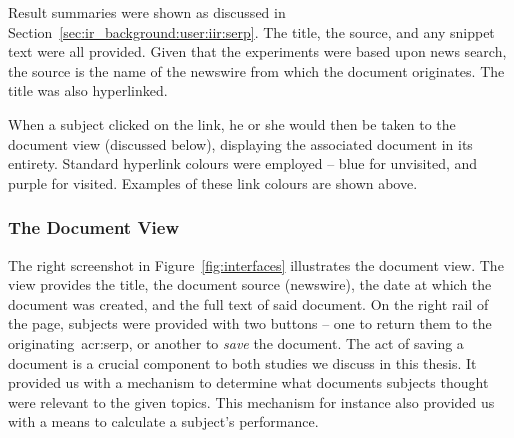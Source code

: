 \begin{figure}[h]
    \centering
    \vspace{4mm}
    \label{fig:serp_buttons}
    \vspace{-5mm}
\end{figure}

Result summaries were shown as discussed in Section~\ref{sec:ir_background:user:iir:serp}. The title, the source, and any snippet text were all provided. Given that the experiments were based upon news search, the source is the name of the newswire from which the document originates. The title was also hyperlinked.

\begin{figure}[h]
    \centering
    \vspace{0mm}
    \label{fig:serp_links}
    \vspace{-13mm}
\end{figure}

When a subject clicked on the link, he or she would then be taken to the document view (discussed below), displaying the associated document in its entirety. Standard hyperlink colours were employed -- blue for unvisited, and purple for visited. Examples of these link colours are shown above.

\subsubsection{The Document View}\label{sec:methodology:user:interface:document}
The right screenshot in Figure~\ref{fig:interfaces} illustrates the document view. The view provides the title, the document source (newswire), the date at which the document was created, and the full text of said document. On the right rail of the page, subjects were provided with two buttons -- one to return them to the originating~\gls{acr:serp}, or another to \emph{save} the document. The act of saving a document is a crucial component to both studies we discuss in this thesis. It provided us with a mechanism to determine what documents subjects thought were relevant to the given topics. This mechanism for instance also provided us with a means to calculate a subject's performance.

